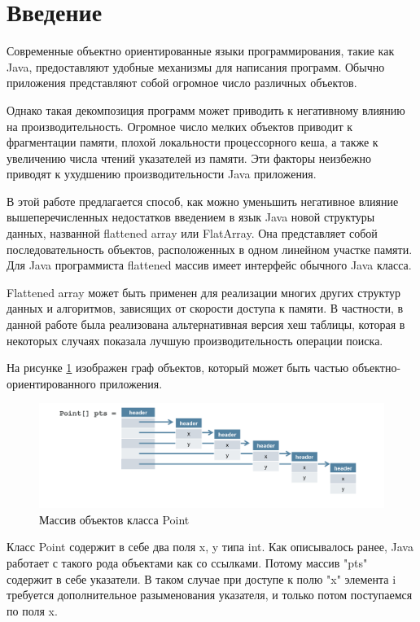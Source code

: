 \section{Введение}
Современные объектно ориентированные языки программирования, такие как Java, предоставляют удобные механизмы для написания программ. Обычно приложения представляют собой огромное число различных объектов. 
\par
Однако такая декомпозиция программ может приводить к негативному влиянию на производительность. Огромное число мелких объектов приводит к фрагментации памяти, плохой локальности процессорного кеша, а также к увеличению числа чтений указателей из памяти. Эти факторы неизбежно приводят к ухудшению производительности Java приложения.
\par
В этой работе предлагается способ, как можно уменьшить негативное влияние вышеперечисленных недостатков введением в язык Java новой структуры данных, названной flattened array или FlatArray. Она представляет собой последовательность объектов, расположенных в одном линейном участке памяти. 
Для Java программиста flattened массив имеет интерфейс обычного Java класса.
\par
Flattened array может быть применен для реализации многих других структур данных и алгоритмов, зависящих от скорости доступа к памяти. В частности, в данной работе была реализована альтернативная версия хеш таблицы, которая в некоторых случаях показала лучшую производительность операции поиска.
\par
На рисунке \ref{ref-graph} изображен граф объектов, который может быть частью объектно-ориентированного приложения.
\begin{figure}[h]
	\caption{Массив объектов класса Point}\label{ref-graph}
	\includegraphics[width=0.95\linewidth]{image/reference.png}
\end{figure}
Класс Point содержит в себе два поля x, y типа int. Как описывалось ранее, Java работает с 
такого рода объектами как со ссылками. Потому массив "pts" содержит в себе указатели. В таком случае при доступе к полю "x" элемента i требуется дополнительное разыменования указателя, и только потом поступаемся по поля x.
